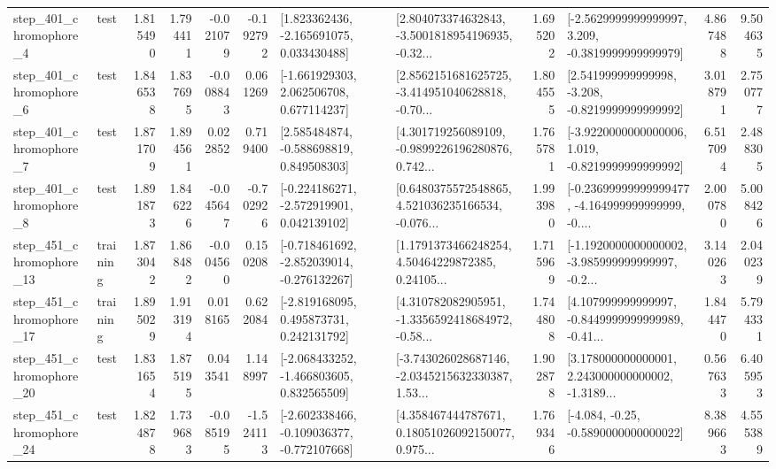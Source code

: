 \begin{tabular}{llrrrrllrlrr}
   step\_401\_chromophore\_4 &      test &      1.815490 &    1.794411 &     -0.021079 & -0.192792 &    [1.823362436, -2.165691075, 0.033430488] &  [2.804073374632843, -3.5001818954196935, -0.32... &       1.695202 &  [-2.5629999999999997, 3.209, -0.3819999999999979] &            4.867488 &          9.504635 \\
   step\_401\_chromophore\_6 &      test &      1.846538 &    1.837695 &     -0.008843 &  0.061269 &    [-1.661929303, 2.062506708, 0.677114237] &  [2.8562151681625725, -3.414951040628818, -0.70... &       1.804555 &   [2.541999999999998, -3.208, -0.8219999999999992] &            3.018791 &          2.750777 \\
   step\_401\_chromophore\_7 &      test &      1.871709 &    1.894561 &      0.022852 &  0.719400 &    [2.585484874, -0.588698819, 0.849508303] &  [4.301719256089109, -0.9899226196280876, 0.742... &       1.765781 &  [-3.9220000000000006, 1.019, -0.8219999999999992] &            6.517094 &          2.488305 \\
   step\_401\_chromophore\_8 &      test &      1.891873 &    1.846226 &     -0.045647 & -0.702926 &   [-0.224186271, -2.572919901, 0.042139102] &  [0.6480375572548865, 4.521036235166534, -0.076... &       1.993980 &  [-0.23699999999999477, -4.164999999999999, -0.... &            2.000780 &          5.008426 \\
  step\_451\_chromophore\_13 &  training &      1.873042 &    1.868482 &     -0.004560 &  0.150208 &  [-0.718461692, -2.852039014, -0.276132267] &  [1.1791373466248254, 4.50464229872385, 0.24105... &       1.715969 &  [-1.1920000000000002, -3.985999999999997, -0.2... &            3.140263 &          2.040239 \\
  step\_451\_chromophore\_17 &  training &      1.895029 &    1.913194 &      0.018165 &  0.622084 &    [-2.819168095, 0.495873731, 0.242131792] &  [4.310782082905951, -1.3356592418684972, -0.58... &       1.744808 &  [4.107999999999997, -0.8449999999999989, -0.41... &            1.844470 &          5.794331 \\
  step\_451\_chromophore\_20 &      test &      1.831654 &    1.875195 &      0.043541 &  1.148997 &   [-2.068433252, -1.466803605, 0.832565509] &  [-3.743026028687146, -2.0345215632330387, 1.53... &       1.902878 &  [3.178000000000001, 2.243000000000002, -1.3189... &            0.567633 &          6.405953 \\
  step\_451\_chromophore\_24 &      test &      1.824878 &    1.739683 &     -0.085195 & -1.524113 &  [-2.602338466, -0.109036377, -0.772107668] &  [4.358467444787671, 0.18051026092150077, 0.975... &       1.769346 &               [-4.084, -0.25, -0.5890000000000022] &            8.389663 &          4.555389 \\

\end{tabular}
